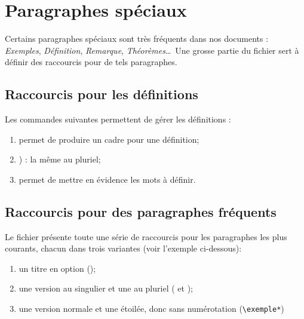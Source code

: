 \chapter{Paragraphes spéciaux}
\label{ch:paragraphesSpeciaux}

Certains paragraphes spéciaux sont très fréquents dans nos documents : \emph{Exemples}, \emph{Définition}, \emph{Remarque}, \emph{Théorèmes}\dots \ Une grosse partie du fichier  sert à définir des raccourcis pour de tels paragraphes. 




\section{Raccourcis pour les définitions}
\label{sec:paragrapheSpecialDefin}

Les commandes suivantes permettent de gérer les définitions :
\begin{enumerate}
	\item \texttt{} permet de produire un cadre pour une définition;
	\item \texttt{}) : la même au pluriel;
	\item \texttt{\emphdef} permet de mettre en évidence les mots à définir.
\end{enumerate}


\begin{LTXexample}[pos=o,width=.4]
\end{LTXexample}





\section{Raccourcis pour des paragraphes fréquents}
\label{sec:paragraphesSpeciauxThmtools}

Le fichier  présente toute une série de raccourcis pour les paragraphes les plus courants, chacun dans trois variantes (voir l'exemple ci-dessous):
\begin{enumerate}
	\item un titre en option (\texttt{});
	\item une version au singulier et une au pluriel (\texttt{\exemple} et \texttt{\exemples});
	\item une version normale et une étoilée, donc sans numérotation (\lstinline!\exemple*!)
\end{enumerate}

